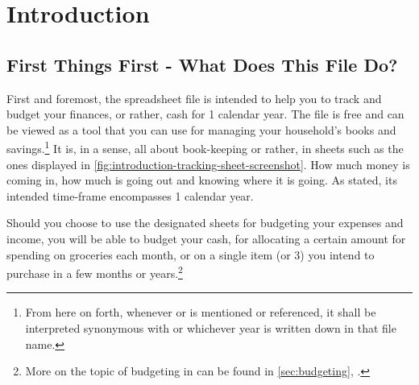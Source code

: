 \section{Introduction}
\label{sec:introduction}

\subsection{First Things First - What Does This File Do?}
\label{subsec:first-things-first}

First and foremost, the spreadsheet file  is intended to help you to track and budget your finances, or rather, cash for 1 calendar year.
The file is free and can be viewed as a tool that you can use for managing your household's books and savings.\footnote{From here on forth, whenever  or \sterm{\tfn} is mentioned or referenced, it shall be interpreted synonymous with  or whichever year is written down in that file name.}
It is, in a sense, all about book-keeping or rather,  in sheets such as the ones displayed in \autoref{fig:introduction-tracking-sheet-screenshot}.
How much money is coming in, how much is going out and knowing where it is going.
As stated, its intended time-frame encompasses 1 calendar year.


\begin{comment}
\begin{figure}[htp]
	\centering
	\caption[Screenshot of the Tracking Sheet named \sheetname{Groceries}]{Screenshot of the Tracking Sheet \sheetname{Groceries}.
	d0f8934zsd.
	The values and therefor the diagrams are fake and engineered to make up some kind of scenario for the sake of the screenshot.}
	\label{fig:introduction-tracking-sheet-screenshot}
\end{figure}
\end{comment}

Should you choose to use the designated sheets for budgeting your expenses and income, you will be able to budget your cash, \eg for allocating a certain amount for spending on groceries each month, or on a single item (or 3) you intend to purchase in a few months or years.\footnote{More on the topic of budgeting in \tfn can be found in \autoref{sec:budgeting}, .}



